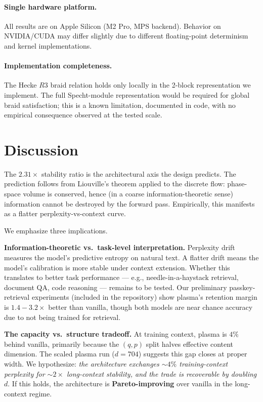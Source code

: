 \documentclass[11pt]{article}
\begin{document}
\paragraph{Single hardware platform.} All results are on Apple Silicon
(M2 Pro, MPS backend). Behavior on NVIDIA/CUDA may differ slightly due
to different floating-point determinism and kernel implementations.

\paragraph{Implementation completeness.} The Hecke $R3$ braid relation
holds only locally in the 2-block representation we implement. The full
Specht-module representation would be required for global braid
satisfaction; this is a known limitation, documented in code, with no
empirical consequence observed at the tested scale.

\section{Discussion}
\label{sec:discussion}

The $2.31\times$ stability ratio is the architectural axis the design
predicts. The prediction follows from Liouville's theorem applied to the
discrete flow: phase-space volume is conserved, hence (in a coarse
information-theoretic sense) information cannot be destroyed by the
forward pass. Empirically, this manifests as a flatter perplexity-vs-context
curve.

We emphasize three implications.

\textbf{Information-theoretic vs.\ task-level interpretation.} Perplexity
drift measures the model's predictive entropy on natural text. A flatter
drift means the model's calibration is more stable under context
extension. Whether this translates to better task performance ---
e.g., needle-in-a-haystack retrieval, document QA, code reasoning ---
remains to be tested. Our preliminary passkey-retrieval experiments
(included in the repository) show plasma's retention margin is
$1.4{-}3.2\times$ better than vanilla, though both models are near
chance accuracy due to not being trained for retrieval.

\textbf{The capacity vs.\ structure tradeoff.} At training context,
plasma is $4\%$ behind vanilla, primarily because the $(q, p)$ split
halves effective content dimension. The scaled plasma run ($d = 704$)
suggests this gap closes at proper width. We hypothesize:
\emph{the architecture exchanges $\sim 4\%$ training-context perplexity
for $\sim 2\times$ long-context stability, and the trade is recoverable
by doubling $d$}. If this holds, the architecture is
\textbf{Pareto-improving} over vanilla in the long-context regime.
\end{document}
